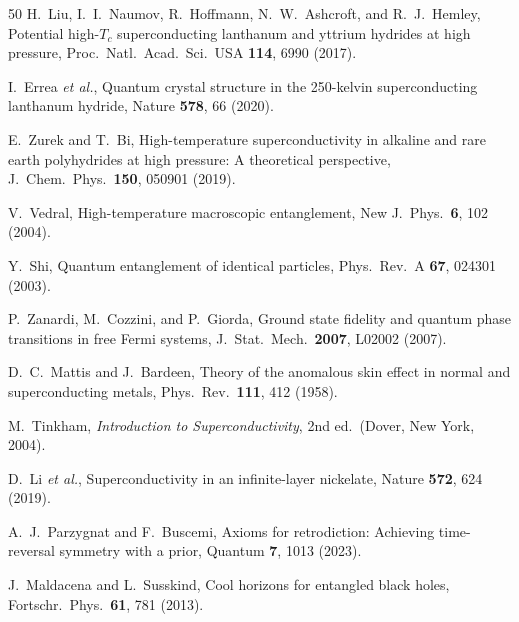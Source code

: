 \documentclass[prb,twocolumn,superscriptaddress,longbibliography,floatfix]{revtex4-2}
\begin{document}
\begin{thebibliography}{50}
H.~Liu, I.~I.~Naumov, R.~Hoffmann, N.~W.~Ashcroft, and R.~J.~Hemley,
Potential high-$T_c$ superconducting lanthanum and yttrium hydrides at high pressure,
Proc.\ Natl.\ Acad.\ Sci.\ USA \textbf{114}, 6990 (2017).

I.~Errea \textit{et al.},
Quantum crystal structure in the 250-kelvin superconducting lanthanum hydride,
Nature \textbf{578}, 66 (2020).

E.~Zurek and T.~Bi,
High-temperature superconductivity in alkaline and rare earth polyhydrides at high pressure:
A theoretical perspective,
J.\ Chem.\ Phys.\ \textbf{150}, 050901 (2019).

V.~Vedral,
High-temperature macroscopic entanglement,
New J.\ Phys.\ \textbf{6}, 102 (2004).

Y.~Shi,
Quantum entanglement of identical particles,
Phys.\ Rev.\ A \textbf{67}, 024301 (2003).

P.~Zanardi, M.~Cozzini, and P.~Giorda,
Ground state fidelity and quantum phase transitions in free Fermi systems,
J.\ Stat.\ Mech.\ \textbf{2007}, L02002 (2007).

D.~C.~Mattis and J.~Bardeen,
Theory of the anomalous skin effect in normal and superconducting metals,
Phys.\ Rev.\ \textbf{111}, 412 (1958).

M.~Tinkham,
\textit{Introduction to Superconductivity}, 2nd ed.\ (Dover, New York, 2004).

D.~Li \textit{et al.},
Superconductivity in an infinite-layer nickelate,
Nature \textbf{572}, 624 (2019).

A.~J.~Parzygnat and F.~Buscemi,
Axioms for retrodiction: Achieving time-reversal symmetry with a prior,
Quantum \textbf{7}, 1013 (2023).

J.~Maldacena and L.~Susskind,
Cool horizons for entangled black holes,
Fortschr.\ Phys.\ \textbf{61}, 781 (2013).

\end{thebibliography}
\end{document}

